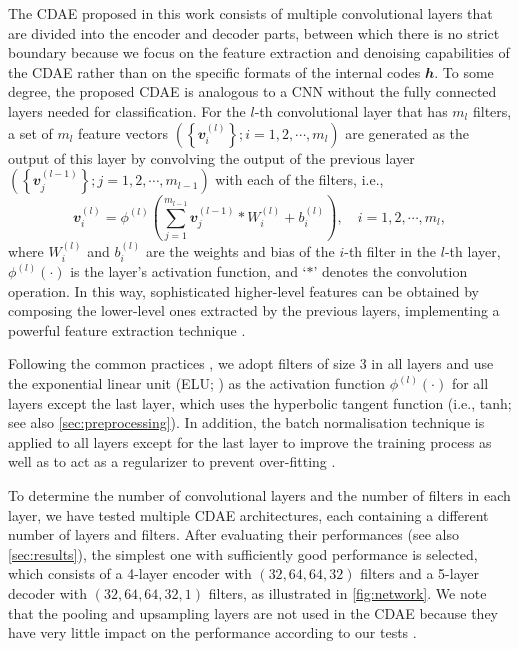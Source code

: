 \documentclass[fleqn,usenatbib]{mnras}
\newcommand{\B}[1]{\mathbfit{#1}}
\newcommand{\editone}[1]{{\leavevmode\color{cyan}#1}}
\begin{document}
\editone{%
The CDAE proposed in this work consists of multiple convolutional layers
that are divided into the encoder and decoder parts, between which there is
no strict boundary because we focus on the feature extraction and denoising
capabilities of the CDAE rather than on the specific formats of the
internal codes $\B{h}$.
To some degree, the proposed CDAE is analogous to a CNN without the fully
connected layers needed for classification.
For the $l$-th convolutional layer that has $m_l$ filters, a set of $m_l$
feature vectors
$\left(\left\{ \B{v}_{i}^{(l)} \right\}; i = 1, 2, \cdots, m_l \right)$
are generated as the output of this layer by convolving the output of the
previous layer
$\left(\left\{ \B{v}_{j}^{(l-1)} \right\}; j = 1, 2, \cdots, m_{l-1} \right)$
with each of the filters, i.e.,
\begin{equation}
  \label{eq:conv}
  \B{v}_{i}^{(l)} = \phi^{(l)} \left( \sum_{j=1}^{m_{l-1}}
    \B{v}_{j}^{(l-1)} * W_i^{(l)} + b_i^{(l)} \right),
    \quad i = 1, 2, \cdots, m_{l},
\end{equation}
where
$W_i^{(l)}$ and $b_i^{(l)}$ are the weights and bias of the $i$-th filter
in the $l$-th layer, $\phi^{(l)}(\cdot)$ is the layer's activation
function, and `$*$' denotes the convolution operation.
In this way, sophisticated higher-level features can be obtained by
composing the lower-level ones extracted by the previous layers,
implementing a powerful feature extraction technique \citep{lecun2015}.

Following the common practices \citep[e.g.,][]{geron2017,suganuma2018},
we adopt filters of size 3 in all layers and use the exponential linear
unit (ELU; \citealt{clevert2016}) as the activation function
$\phi^{(l)}(\cdot)$ for all layers except the last layer, which uses
the hyperbolic tangent function (i.e., tanh;
see also \autoref{sec:preprocessing}).
In addition, the batch normalisation technique is applied to all layers
except for the last layer to improve the training process as well as to act
as a regularizer to prevent over-fitting \citep{ioffe2015}.

To determine the number of convolutional layers and the number of filters
in each layer, we have tested multiple CDAE architectures, each containing
a different number of layers and filters.
After evaluating their performances (see also \autoref{sec:results}),
the simplest one with sufficiently good performance is selected,
which consists of a 4-layer encoder with $(32,64,64,32)$ filters and
a 5-layer decoder with $(32,64,64,32,1)$ filters, as illustrated in
\autoref{fig:network}.
We note that the pooling and upsampling layers are not used in the CDAE
because they have very little impact on the performance according to our
tests \citep[see also][]{springenberg2015}.
} %
\end{document}
